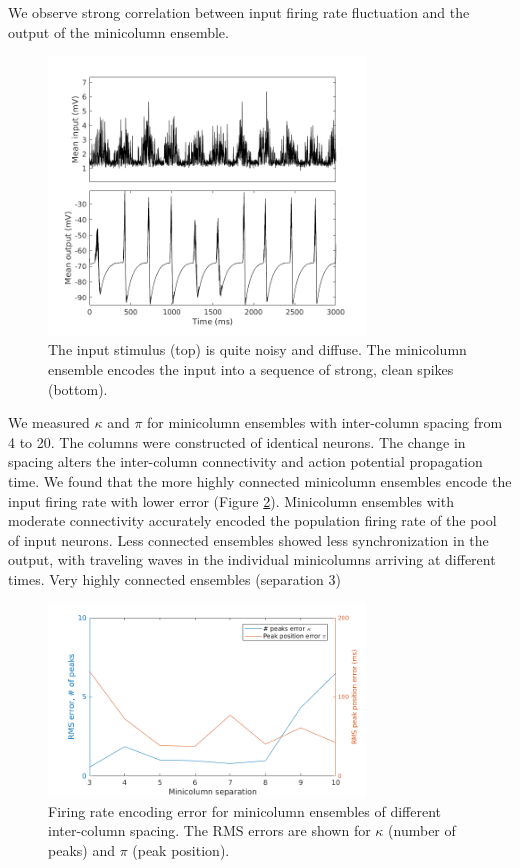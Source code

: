 \documentclass[a4paper,11pt]{article}
\begin{document}
We observe strong correlation between input firing rate fluctuation and the output of the minicolumn ensemble.
\begin{figure}[!h]
 \caption{The input stimulus (top) is quite noisy and diffuse. The minicolumn ensemble encodes the input into a sequence of strong, clean spikes (bottom).}
 \label{fig:goodIO}
 \centering
   \includegraphics[width=0.75\textwidth]{fig/InputOutput_Sep7}
\end{figure}

We measured $\kappa$ and $\pi$ for minicolumn ensembles with inter-column spacing from 4 to 20.
The columns were constructed of identical neurons.
The change in spacing alters the inter-column connectivity and action potential propagation time.
We found that the more highly connected minicolumn ensembles encode the input firing rate with lower error (Figure \ref{fig:encoding_results}).
Minicolumn ensembles with moderate connectivity accurately encoded the population firing rate of the pool of input neurons.
Less connected ensembles showed less synchronization in the output, with traveling waves in the individual minicolumns arriving at different times.
Very highly connected ensembles (separation 3) 

\begin{figure}[!ht]
 \caption{Firing rate encoding error for minicolumn ensembles of different inter-column spacing. The RMS errors are shown for $\kappa$ (number of peaks) and $\pi$ (peak position).}
 \label{fig:encoding_results}
 \centering
   \includegraphics[width=0.75\textwidth]{fig/EncodingError_10Trials}
\end{figure}
\end{document}
